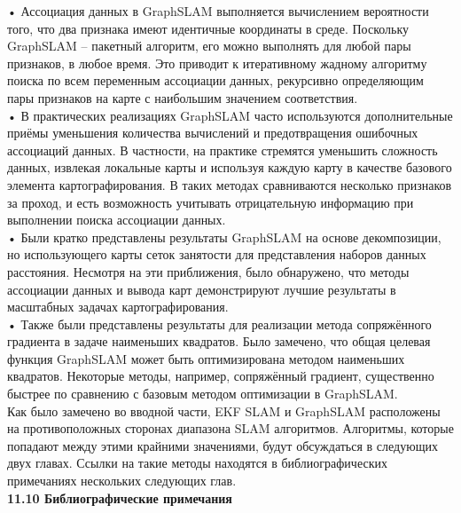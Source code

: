 \documentclass[10pt,a4paper]{article}
\begin{document}
•	Ассоциация данных в GraphSLAM выполняется вычислением вероятности того, что два признака имеют идентичные координаты в среде. Поскольку GraphSLAM – пакетный алгоритм, его можно выполнять для любой пары признаков, в любое время. Это приводит к итеративному жадному алгоритму поиска по всем переменным ассоциации данных, рекурсивно определяющим пары признаков на карте с наибольшим значением соответствия.\\

•	В практических реализациях GraphSLAM часто используются дополнительные приёмы уменьшения количества вычислений и предотвращения ошибочных ассоциаций данных. В частности, на практике стремятся уменьшить сложность данных, извлекая локальные карты и используя каждую карту в качестве базового элемента картографирования. В таких методах сравниваются несколько признаков за проход, и есть возможность учитывать отрицательную информацию при выполнении поиска ассоциации данных.\\

•	Были кратко представлены результаты GraphSLAM на основе декомпозиции, но использующего карты сеток занятости для представления наборов данных расстояния. Несмотря на эти приближения, было обнаружено, что методы ассоциации данных и вывода карт демонстрируют лучшие результаты в масштабных задачах картографирования.\\

•	Также были представлены результаты для реализации метода сопряжённого градиента в задаче наименьших квадратов. Было замечено, что общая целевая функция GraphSLAM может быть оптимизирована методом наименьших квадратов. Некоторые методы, например, сопряжённый градиент, существенно быстрее по сравнению с базовым методом оптимизации в GraphSLAM.\\

Как было замечено во вводной части, EKF SLAM и GraphSLAM расположены на противоположных сторонах диапазона SLAM алгоритмов. Алгоритмы, которые попадают между этими крайними значениями, будут обсуждаться в следующих двух главах. Ссылки на такие методы находятся в библиографических примечаниях нескольких следующих глав.\\

\textbf{11.10	Библиографические примечания} \\
\end{document}
